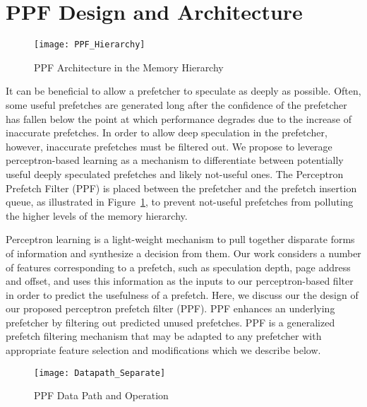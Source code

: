 \section{PPF Design and Architecture}
\label{Arch}

\begin{figure}
  \begin{center}
  \texttt{[image: PPF\_Hierarchy]}
  \caption{PPF Architecture in the Memory Hierarchy}
  \label{fig:PPF_Hierarchy}
  \end{center}
\end{figure}

It can be beneficial to allow a prefetcher to speculate as deeply as
possible. Often, some useful prefetches are generated long after the
confidence of the prefetcher has fallen below the point at which
performance degrades due to the increase of inaccurate prefetches.  In
order to allow deep speculation in the prefetcher, however, inaccurate
prefetches must be filtered out.  We propose to leverage
perceptron-based learning as a mechanism to differentiate between
potentially useful deeply speculated prefetches and likely not-useful
ones. The Perceptron Prefetch Filter (PPF) is placed between the
prefetcher and the prefetch insertion queue, as illustrated in
Figure~\ref{fig:PPF_Hierarchy}, to prevent not-useful prefetches from
polluting the higher levels of the memory hierarchy.

Perceptron learning is a light-weight mechanism to pull together
disparate forms of information and synthesize a decision from
them. Our work considers a number of features corresponding to a
prefetch, such as speculation depth, page address and offset, and uses
this information as the inputs to our perceptron-based filter in order
to predict the usefulness of a prefetch.  Here, we discuss our the
design of our proposed perceptron prefetch filter (PPF).  PPF enhances
{an underlying prefetcher} by filtering out predicted unused prefetches. 
PPF is a generalized prefetch filtering mechanism that may be adapted 
to any prefetcher with appropriate feature selection and modifications 
which we describe below.

\begin{figure}[ht]
  \begin{center}
  \texttt{[image: Datapath\_Separate]}
  \caption{PPF Data Path and Operation}
  \label{fig:PPF_Datapath}
  \end{center}
\end{figure}

